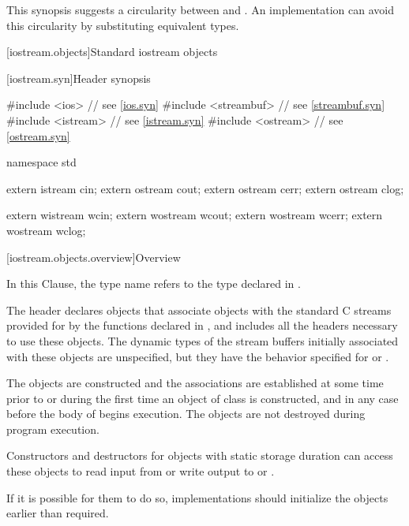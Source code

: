 \pnum
\begin{note}
This synopsis suggests a circularity between
and
.
An implementation can avoid this circularity by substituting equivalent
types.
\end{note}

[iostream.objects]{Standard iostream objects}

[iostream.syn]{Header  synopsis}

%
\begin{codeblock}
#include <ios>          // see \ref{ios.syn}
#include <streambuf>    // see \ref{streambuf.syn}
#include <istream>      // see \ref{istream.syn}
#include <ostream>      // see \ref{ostream.syn}

namespace std {
  extern istream cin;
  extern ostream cout;
  extern ostream cerr;
  extern ostream clog;

  extern wistream wcin;
  extern wostream wcout;
  extern wostream wcerr;
  extern wostream wclog;
}
\end{codeblock}

[iostream.objects.overview]{Overview}

\pnum
In this Clause, the type name  refers to
the type  declared in .

\pnum
The header 
declares objects that associate objects with the
standard C streams provided for by the functions declared in
, and includes all the headers necessary to use these objects.
The dynamic types of the stream buffers
initially associated with these objects are unspecified,
but they have the behavior specified for
or
.

\pnum
The objects are constructed and the associations are established at some
time prior to or during the first time an object of class
 is constructed, and in any case before the body
of  begins execution.
The objects are not destroyed during program execution.
\begin{footnote}
Constructors and destructors for objects with
static storage duration can
access these objects to read input from
or write output to
or
.
\end{footnote}

\pnum
\recommended
If it is possible for them to do so, implementations should
initialize the objects earlier than required.

